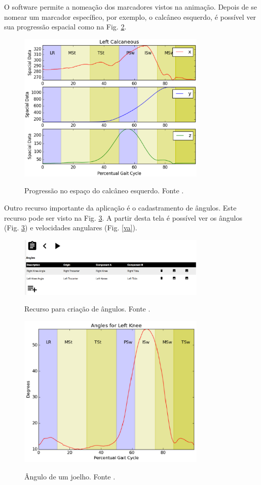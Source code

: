 \documentclass[journal]{IEEEtran}
\begin{document}
O software permite a nomeação dos marcadores vistos na animação. Depois de se nomear um marcador
específico, por exemplo, o calcâneo esquerdo, é possível ver sua progressão espacial como na 
Fig. \ref{progressao}.

\begin{figure}[!t]
	\centering
	{\includegraphics[width=9cm]{tela19}}
	\caption{Progressão no espaço do calcâneo esquerdo. Fonte \cite{Lima2015}.}
	\label{progressao}
\end{figure}

Outro recurso importante da aplicação é o cadastramento de ângulos. 
Este recurso pode ser visto na Fig. \ref{angulos}. 
A partir desta tela é possível ver os ângulos (Fig. \ref{angulos}) e velocidades angulares (Fig. \ref{va}).

\begin{figure}[!t]
	\centering
	{\includegraphics[width=9cm]{tela23}}
	\caption{Recurso para criação de ângulos. Fonte \cite{Lima2015}.}
	\label{progressao}
\end{figure}

\begin{figure}[!t]
	\centering
	{\includegraphics[width=9cm]{tela25}}
	\caption{Ângulo de um joelho. Fonte \cite{Lima2015}.}
	\label{angulos}
\end{figure}
\end{document}
